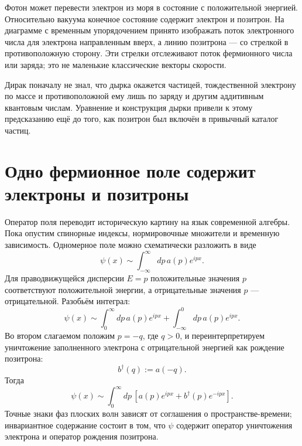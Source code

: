 Фотон может перевести электрон из моря в состояние с положительной энергией. Относительно вакуума конечное состояние содержит электрон и позитрон. На диаграмме с временным упорядочением принято изображать поток электронного числа для электрона направленным вверх, а линию позитрона — со стрелкой в противоположную сторону. Эти стрелки отслеживают поток фермионного числа или заряда; это не маленькие классические векторы скорости.

\begin{classroomqa}
\end{classroomqa}

Дирак поначалу не знал, что дырка окажется частицей, тождественной электрону по массе и противоположной ему лишь по заряду и другим аддитивным квантовым числам. Уравнение и конструкция дырки привели к этому предсказанию ещё до того, как позитрон был включён в привычный каталог частиц.

\section{Одно фермионное поле содержит электроны и позитроны}

Оператор поля переводит историческую картину на язык современной алгебры. Пока опустим спинорные индексы, нормировочные множители и временную зависимость. Одномерное поле можно схематически разложить в виде
\begin{equation}
\psi(x)
\sim
\int_{-\infty}^{\infty}dp\,a(p)e^{ipx}.
\label{eq:l10-full-field-integral}
\end{equation}
Для праводвижущейся дисперсии \(E=p\) положительные значения \(p\) соответствуют положительной энергии, а отрицательные значения \(p\) — отрицательной. Разобьём интеграл:
\begin{equation}
\psi(x)
\sim
\int_0^\infty dp\,a(p)e^{ipx}
+
\int_{-\infty}^0 dp\,a(p)e^{ipx}.
\end{equation}
Во втором слагаемом положим \(p=-q\), где \(q>0\), и переинтерпретируем уничтожение заполненного электрона с отрицательной энергией как рождение позитрона:
\begin{equation}
b^\dagger(q):=a(-q).
\end{equation}
Тогда
\begin{equation}
\psi(x)
\sim
\int_0^\infty dp\,
\left[
a(p)e^{ipx}
+
b^\dagger(p)e^{-ipx}
\right].
\label{eq:l10-electron-positron-split}
\end{equation}
Точные знаки фаз плоских волн зависят от соглашения о пространстве-времени; инвариантное содержание состоит в том, что \(\psi\) содержит оператор уничтожения электрона и оператор рождения позитрона.

